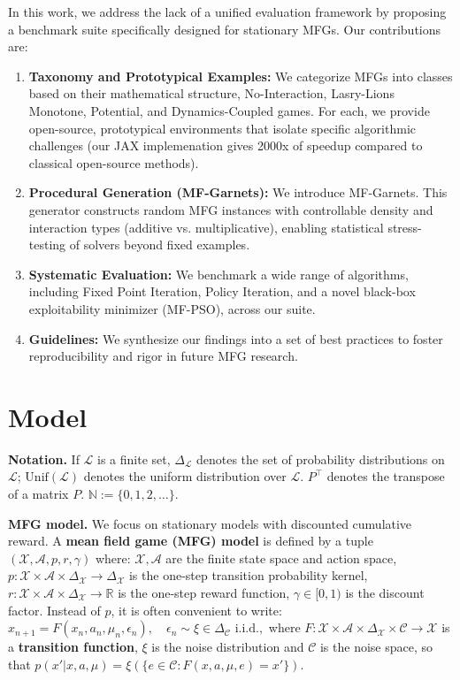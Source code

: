 \documentclass[10pt,twocolumn,letterpaper]{article}
\theoremstyle{definition}
\theoremstyle{remark}
\newcommand{\states}{\mathcal{X}}
\newcommand{\actions}{\mathcal{A}}
\newcommand{\noises}{\mathcal{C}}
\newcommand{\unif}{\mathrm{Unif}}
\begin{document}
In this work, we address the lack of a unified evaluation framework by proposing a benchmark suite specifically designed for stationary MFGs. Our contributions are: 
\begin{mdframed}[
    linecolor=blue!20,      %
    linewidth=0pt,        %
    roundcorner=5pt,        %
    backgroundcolor=blue!5, 
    innertopmargin=7pt, 
    innerbottommargin=5pt
]
\begin{enumerate}
    \item \textbf{Taxonomy and Prototypical Examples:} We categorize MFGs into classes based on their mathematical structure, No-Interaction, Lasry-Lions Monotone, Potential, and Dynamics-Coupled games. For each, we provide open-source, prototypical environments that isolate specific algorithmic challenges (our JAX implemenation gives 2000x of speedup compared to classical open-source methods).
    \item \textbf{Procedural Generation (MF-Garnets):} We introduce MF-Garnets. This generator constructs random MFG instances with controllable density and interaction types (additive vs. multiplicative), enabling statistical stress-testing of solvers beyond fixed examples.
    \item \textbf{Systematic Evaluation:} We benchmark a wide range of algorithms, including Fixed Point Iteration, Policy Iteration, and a novel black-box exploitability minimizer (MF-PSO), across our suite.
    \item \textbf{Guidelines:} We synthesize our findings into a set of best practices to foster reproducibility and rigor in future MFG research.
\end{enumerate}
\end{mdframed}


\section{Model}


\noindent\textbf{Notation.} If  $\mathcal L$ is a finite set, $\Delta_{\mathcal L}$ denotes the set of probability distributions on $\mathcal L$; $\unif(\mathcal{L})$ denotes the uniform distribution over $\mathcal{L}$. $P^\top$ denotes the transpose of a matrix $P$. $\mathbb N := \{0,1,2,\dots\}$.

\noindent\textbf{MFG model.} We focus on stationary models with discounted cumulative reward. A {\bf mean field game (MFG) model} is defined by a tuple $(\states, \actions, p, r, \gamma)$ where:
$\states, \actions$ are the finite state space and action space,
$p: \states \times \actions \times \Delta_{\states} \to \Delta_{\states}$ is the one-step transition probability kernel,
$r: \states \times \actions \times \Delta_{\states} \to \mathbb R$ is the one-step reward function,
$\gamma \in [0,1)$ is the discount factor. 
Instead of $p$, it is often convenient to write:
\(
    x_{n+1} = F(x_n, a_n, \mu_n, \epsilon_n), \quad \epsilon_n \sim \xi \in \Delta_{\noises} \text{ i.i.d.},
\)
where $F: \states \times \actions \times \Delta_{\states} \times \noises \to \states$ is a {\bf transition function}, $\xi$ is the noise distribution and $\noises$ is the noise space, 
so that $p(x'|x,a,\mu) = \xi(\{ e \in \noises : F(x,a,\mu,e) = x' \})$.
\end{document}
